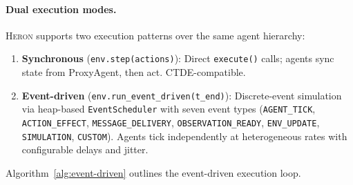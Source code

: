 \documentclass{article}
\newcommand{\heron}{\textsc{Heron}}
\begin{document}
\paragraph{Dual execution modes.}
\heron{} supports two execution patterns over the same agent hierarchy:
\begin{enumerate}[nosep]
    \item \textbf{Synchronous} (\texttt{env.step(actions)}): Direct \texttt{execute()} calls; agents sync state from ProxyAgent, then act. CTDE-compatible.
    \item \textbf{Event-driven} (\texttt{env.run\_event\_driven(t\_end)}): Discrete-event simulation via heap-based \texttt{EventScheduler} with seven event types (\texttt{AGENT\_TICK}, \texttt{ACTION\_EFFECT}, \texttt{MESSAGE\_DELIVERY}, \texttt{OBSERVATION\_READY}, \texttt{ENV\_UPDATE}, \texttt{SIMULATION}, \texttt{CUSTOM}). Agents tick independently at heterogeneous rates with configurable delays and jitter.
\end{enumerate}

Algorithm~\ref{alg:event-driven} outlines the event-driven execution loop.
\end{document}
